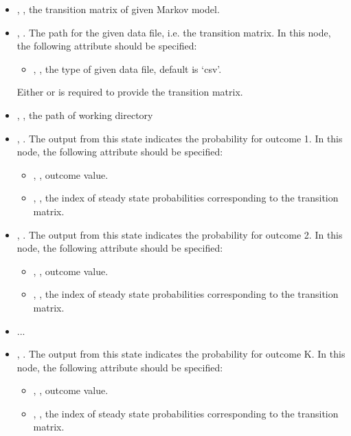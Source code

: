 \begin{itemize}
  \item {}, , the transition matrix of given Markov model.
  \item {}, . The path for the given data file, i.e. the transition matrix.
    In this node, the following attribute should be specified:
    \begin{itemize}
      \item {}, , the type of given data file, default is `csv'.
    \end{itemize}
  \nb Either  or  is required to provide the transition matrix.
  \item {}, , the path of working directory
  \item {}, . The output from this state indicates
    the probability for outcome 1.
    In this node, the following attribute should be specified:
    \begin{itemize}
      \item {}, , outcome value.
      \item {}, , the index of steady state probabilities corresponding to the transition matrix.
    \end{itemize}
  \item {}, . The output from this state indicates
    the probability for outcome 2.
    In this node, the following attribute should be specified:
    \begin{itemize}
      \item {}, , outcome value.
      \item {}, , the index of steady state probabilities corresponding to the transition matrix.
    \end{itemize}
  \item ...
  \item {}, . The output from this state indicates
    the probability for outcome K.
    In this node, the following attribute should be specified:
    \begin{itemize}
      \item {}, , outcome value.
      \item {}, , the index of steady state probabilities corresponding to the transition matrix.
    \end{itemize}

\end{itemize}

